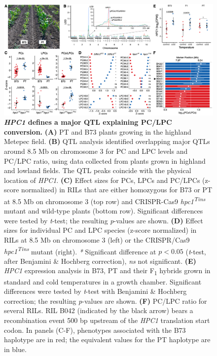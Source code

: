 \documentclass[9pt,twocolumn,twoside,lineno]{biorxiv}
\newcommand{\hpc}{\textit{HPC1}\xspace}
\begin{document}
\begin{figure}[ht]
\centering
\includegraphics[width=0.8\paperwidth]{Figures/Fig_3.png}
\caption{\textbf{\hpc defines a major QTL explaining PC/LPC conversion.} 
\textbf{(A)} PT and B73 plants growing in the highland Metepec field. 
\textbf{(B)} QTL analysis identified overlapping major QTLs around 8.5 Mb on chromosome 3 for PC and LPC levels and PC/LPC ratio, using data collected from plants grown in highland and lowland fields. 
The QTL peaks coincide with the physical location of \hpc. 
\textbf{(C)} Effect sizes for PCs, LPCs and PC/LPCs (z-score normalized) in RILs that are either homozygous for B73 or PT at 8.5 Mb on chromosome 3 (top row) and CRISPR-Cas9 \textit{hpc1\textsuperscript{Tins}} mutant and wild-type plants (bottom row).
Significant differences were tested by \textit{t}-test; the resulting \textit{p}-values are shown. 
\textbf{(D)} Effect sizes for individual PC and LPC species (z-score normalized) in RILs at 8.5 Mb on chromosome 3 (left) or the CRISPR/Cas9 \textit{hpc1\textsuperscript{Tins}} mutant (right). \textit{*} Significant difference at $p < 0.05$ (\textit{t}-test, after Benjamini \& Hochberg correction), \textit{ns} not significant.
\textbf{(E)} \hpc expression analysis in B73, PT and their F\textsubscript{1} hybrids grown in standard and cold temperatures in a growth chamber. Significant differences were tested by \textit{t}-test with Benjamini \& Hochberg correction; the resulting \textit{p}-values are shown.
\textbf{(F)} PC/LPC ratio for several RILs. RIL B042 (indicated by the black arrow) bears a recombination event 500 bp upstream of the \hpc translation start codon.
In panels (C-F), phenotypes associated with the B73 haplotype are in red; the equivalent values for the PT haplotype are in blue.}
\label{Fig3}
\centering
\end{figure}
\end{document}
